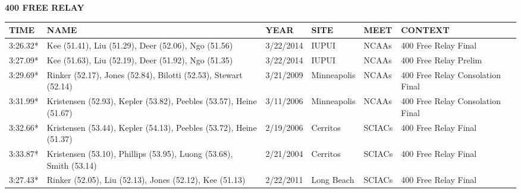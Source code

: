 \vspace{0.4cm}

\begin{center}
\begin{minipage}[t]{0.7\textwidth}
\centering
\textbf{400 FREE RELAY}\\[0.05cm]
\begin{tabular}{@{}p{1.8cm}p{2.8cm}p{1.2cm}p{1.4cm}p{1.4cm}p{2.0cm}@{}}
\hline
\textbf{TIME} & \textbf{NAME} & \textbf{YEAR} & \textbf{SITE} & \textbf{MEET} & \textbf{CONTEXT} \\
\hline
3:26.32* & Kee (51.41), Liu (51.29), Deer (52.06), Ngo (51.56) & 3/22/2014 & IUPUI & NCAAs & 400 Free Relay Final \\
3:27.09* & Kee (51.63), Liu (52.19), Deer (51.92), Ngo (51.35) & 3/22/2014 & IUPUI & NCAAs & 400 Free Relay Prelim \\
3:29.69* & Rinker (52.17), Jones (52.84), Bilotti (52.53), Stewart (52.14) & 3/21/2009 & Minneapolis & NCAAs & 400 Free Relay Consolation Final \\
3:31.99* & Kristensen (52.93), Kepler (53.82), Peebles (53.57), Heine (51.67) & 3/11/2006 & Minneapolis & NCAAs & 400 Free Relay Consolation Final \\
3:32.66* & Kristensen (53.44), Kepler (54.13), Peebles (53.72), Heine (51.37) & 2/19/2006 & Cerritos & SCIACs & 400 Free Relay Final \\
3:33.87* & Kristensen (53.10), Phillips (53.95), Luong (53.68), Smith (53.14) & 2/21/2004 & Cerritos & SCIACs & 400 Free Relay Final \\
3:27.43* & Rinker (52.05), Liu (52.13), Jones (52.12), Kee (51.13) & 2/22/2011 & Long Beach & SCIACs & 400 Free Relay Final \\
\hline
\end{tabular}
\end{minipage}
\end{center}

\vspace{0.4cm}

